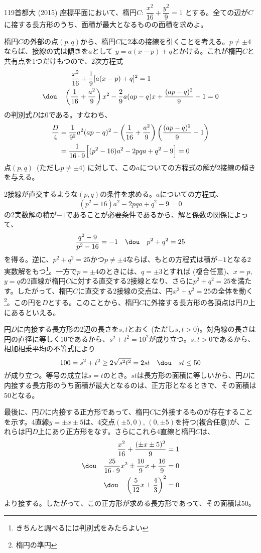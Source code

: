 \begin{thm}{119}{}{首都大 (2015)}
 座標平面において、楕円$C$: $\dfrac{x^2}{16}+\dfrac{y^2}{9}=1$ とする。全ての辺が$C$に接する長方形のうち、面積が最大となるものの面積を求めよ。
\end{thm}

楕円$C$の外部の点$(p, q)$から、楕円$C$に2本の接線を引くことを考える。$p\neq\pm 4$ならば、接線の式は傾きを$a$として $y=a(x-p)+q$とかける。これが楕円$C$と共有点を1つだけもつので、2次方程式
\begin{align*}
 &\quad\frac{x^2}{16}+\frac{1}{9}[a(x-p)+q]^2=1 \\
 \dou\quad &\left(\frac{1}{16}+\frac{a^2}{9}\right)x^2-\frac{2}{9}a(ap-q)x+\frac{(ap-q)^2}{9}-1=0
\end{align*}
の判別式$D$は0である。すなわち、
\begin{align*}
 \frac{D}{4}&=\frac{1}{9^2}a^2(ap-q)^2-\left(\frac{1}{16}+\frac{a^2}{9}\right)\left(\frac{(ap-q)^2}{9}-1\right) \\
 &=\frac{1}{16\cdot9}\Bigl[(p^2-16)a^2-2pqa+q^2-9\Bigr]=0
\end{align*}
点$(p, q)$~(ただし$p\neq\pm 4$) に対して、この$a$についての方程式の解が2接線の傾きを与える。

2接線が直交するような$(p, q)$の条件を求める。$a$についての方程式、
\[ (p^2-16)a^2-2pqa+q^2-9=0 \]
の2実数解の積が$-1$であることが必要条件であるから、解と係数の関係によって、
\[ \frac{q^2-9}{p^2-16}=-1 \quad\dou\quad p^2+q^2=25 \]
を得る。逆に、$p^2+q^2=25$かつ$p\neq\pm 4$ならば、もとの方程式は積が$-1$となる2実数解をもつ\footnote{きちんと調べるには判別式をみたらよい}。一方で$p=\pm 4$のときには、$q=\pm 3$とすれば (複合任意)、$x=p$, $y=q$の2直線が楕円$C$に対する直交する2接線となり、さらに$p^2+q^2=25$を満たす。したがって、楕円$C$に直交する2接線の交点は、円$x^2+y^2=25$の全体を動く\footnote{楕円の準円}。この円を$D$とする。このことから、楕円$C$に外接する長方形の各頂点は円$D$上にあるといえる。

円$D$に内接する長方形の2辺の長さを$s, t$とおく (ただし$s, t>0$)。対角線の長さは円の直径に等しく$10$であるから、$s^2+t^2=10^2$が成り立つ。$s, t>0$であるから、相加相乗平均の不等式により
\[ 100=s^2+t^2\ge 2\sqrt{s^2t^2}=2st \quad\dou\quad st\le 50 \]
が成り立つ。等号の成立は$s=t$のとき。$st$は長方形の面積に等しいから、円$D$に内接する長方形のうち面積が最大となるのは、正方形となるときで、その面積は$50$となる。

最後に、円$D$に内接する正方形であって、楕円$C$に外接するものが存在することを示す。4直線$y=\pm x\pm5$は、4交点$(\pm5, 0)$, $(0, \pm5)$を持つ(複合任意)が、これらは円$D$上にあり正方形をなす。さらにこれら4直線と楕円$C$は、
\begin{align*}
 \frac{x^2}{16}+\frac{(\pm x\pm 5)^2}{9}&=1 \\
 \dou\quad \frac{25}{16\cdot 9}x^2\pm \frac{10}{9}x+\frac{16}{9}&=0 \\
 \dou\quad \left(\frac{5}{12}x \pm \frac{4}{3}\right)^2&=0 \\
\end{align*}
より接する。したがって、この正方形が求める長方形であって、その面積は50。
